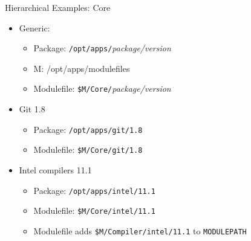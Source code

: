 \documentclass{beamer}
\begin{document}
\begin{frame}{Hierarchical Examples: Core}
  \begin{itemize}
    \item Generic:
      \begin{itemize}
        \item Package: \texttt{/opt/apps/}\emph{package/version}
        \item M: {\color{blue}/opt/apps/modulefiles}
        \item Modulefile: \texttt{{\color{blue}\$M}/Core/}\emph{package/version}
      \end{itemize}
    \item Git 1.8
      \begin{itemize}
        \item Package: \texttt{/opt/apps/git/1.8}
        \item Modulefile: \texttt{{\color{blue}\$M}/Core/git/1.8}
      \end{itemize}
    \item Intel compilers 11.1
      \begin{itemize}
        \item Package: \texttt{/opt/apps/intel/11.1}
        \item Modulefile: \texttt{{\color{blue}\$M}/Core/intel/11.1}
        \item Modulefile adds \texttt{{\color{blue}\$M}/Compiler/intel/11.1} to \texttt{MODULEPATH}
      \end{itemize}
  \end{itemize}
\end{frame}
\end{document}
